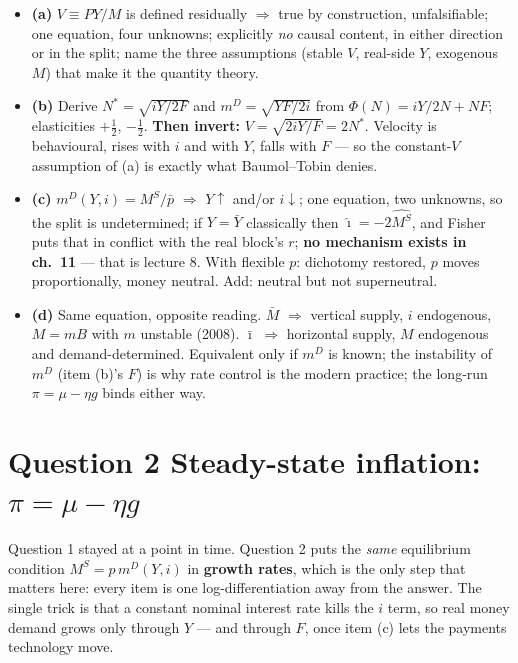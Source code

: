 \documentclass[11pt, a4paper]{article}
\newcommand{\pb}{\bar p}
\newcommand{\Ms}{M^{S}}
\newcommand{\md}{m^{D}}
\newcommand{\Nst}{N^{\ast}}
\begin{document}
\begin{tcolorbox}[rubricbox]
\small
\begin{itemize}
\item \textbf{(a)} $V\equiv PY/M$ is defined residually $\Rightarrow$ true by construction,
      unfalsifiable; one equation, four unknowns; explicitly \emph{no} causal content, in
      either direction or in the split; name the three assumptions (stable $V$, real-side
      $Y$, exogenous $M$) that make it the quantity theory.
\item \textbf{(b)} Derive $\Nst=\sqrt{iY/2F}$ and $\md=\sqrt{YF/2i}$ from
      $\Phi(N)=iY/2N+NF$; elasticities $+\tfrac12$, $-\tfrac12$. \textbf{Then invert:}
      $V=\sqrt{2iY/F}=2\Nst$. Velocity is behavioural, rises with $i$ and with $Y$, falls with
      $F$ --- so the constant-$V$ assumption of (a) is exactly what Baumol--Tobin denies.
\item \textbf{(c)} $\md(Y,i)=\Ms/\pb$ $\Rightarrow$ $Y\uparrow$ and/or $i\downarrow$; one
      equation, two unknowns, so the split is undetermined; if $Y=\bar Y$ classically then
      $\hat{\imath}=-2\widehat{\Ms}$, and Fisher puts that in conflict with the real block's
      $r$; \textbf{no mechanism exists in ch.\ 11} --- that is lecture 8. With flexible $p$:
      dichotomy restored, $p$ moves proportionally, money neutral. Add: neutral but not
      superneutral.
\item \textbf{(d)} Same equation, opposite reading. $\bar M$ $\Rightarrow$ vertical supply,
      $i$ endogenous, $M=mB$ with $m$ unstable (2008). $\bar\imath$ $\Rightarrow$ horizontal
      supply, $M$ endogenous and demand-determined. Equivalent only if $\md$ is known; the
      instability of $\md$ (item (b)'s $F$) is why rate control is the modern practice; the
      long-run $\pi=\mu-\eta g$ binds either way.
\end{itemize}
\end{tcolorbox}

\section{Question 2 \quad Steady-state inflation: $\pi=\mu-\eta g$}

\begin{tcolorbox}[planbox, title={What changes from Question 1}]
\small
Question 1 stayed at a point in time. Question 2 puts the \emph{same} equilibrium condition
$\Ms=p\,\md(Y,i)$ in \textbf{growth rates}, which is the only step that matters here: every
item is one log-differentiation away from the answer. The single trick is that a constant
nominal interest rate kills the $i$ term, so real money demand grows only through $Y$ --- and
through $F$, once item (c) lets the payments technology move.
\end{tcolorbox}
\end{document}
